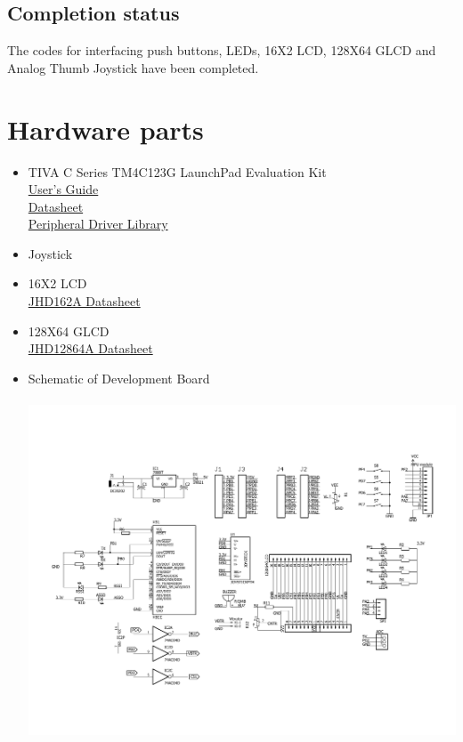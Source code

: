 \documentclass[a4paper,12pt,oneside]{book}
\begin{document}
\subsection*{Completion status}
The codes for interfacing push buttons, LEDs, 16X2 LCD, 128X64 GLCD and Analog Thumb Joystick have been completed.

\section{Hardware parts}
\begin{itemize}
  \item TIVA C Series TM4C123G LaunchPad Evaluation Kit\\
  \href{http://www.ti.com/lit/ug/spmu296/spmu296.pdf}{User's Guide}\\
  \href{http://www.ti.com.cn/cn/lit/ds/symlink/tm4c123gh6pm.pdf}{Datasheet}\\
  \href{http://www.ti.com/lit/ug/spmu298a/spmu298a.pdf}{Peripheral Driver Library}
  \item Joystick
  \item 16X2 LCD \\
  \href{http://www.agspecinfo.com/pdfs/J/JHD162A.PDF}{JHD162A Datasheet}\\
  \item 128X64 GLCD\\
  \href{http://www.agspecinfo.com/pdfs/J/JHD12864.PDF}{JHD12864A Datasheet}\\
  \item Schematic of Development Board\\~\\
  \includegraphics[scale = 0.5]{Gameconsol.pdf}
\end{itemize}
\end{document}
